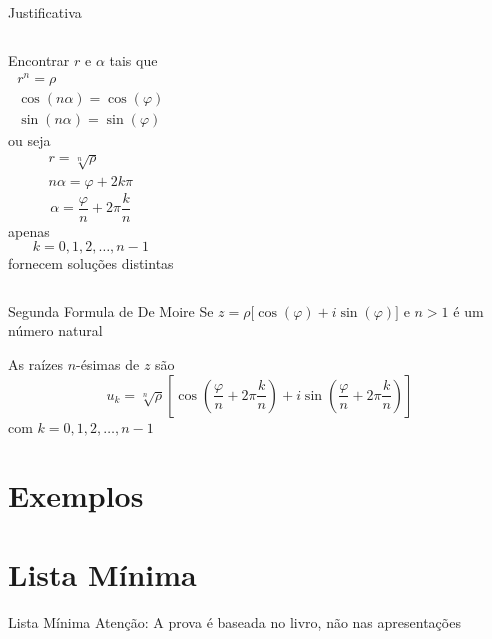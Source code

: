 \documentclass[fleqn,utf8,aspectratio=169,12pt,ignorenonframetext]{beamer}
\begin{document}
\begin{proofframe}{Justificativa}
\begin{columns}
  Encontrar $r$ e $\alpha$
  \pause
   tais que
  \begin{gather*}
    r^n = \rho \\
    \cos(n\alpha) = \cos(\varphi) \\
    \sin(n\alpha) = \sin(\varphi)
  \end{gather*}
  \pause
  ou seja
  \begin{gather*}
    r = \sqrt[n]{\rho} \\
    n\alpha = \varphi + 2k\pi
  \end{gather*}
  \pause
  \[
    \alpha = \frac{\varphi}{n} + 2\pi\frac{k}{n}
  \]
  \pause
  apenas
  \[
    k = 0, 1, 2, \dots, n-1
  \]
  fornecem soluções distintas
\end{columns}
\end{proofframe}

\begin{frame}{Segunda Formula de De Moire}
  Se
  \(
    z = \rho \big[\cos(\varphi) + i\sin(\varphi)\big]
  \)
  e $n>1$ é um número natural

  \vspace{\baselineskip}
  As raízes $n$-ésimas de $z$ são
  \[
    u_k = \sqrt[n]{\rho}
    \left[
         \cos\left(\frac{\varphi}{n}+2\pi\frac{k}{n}\right)
      + i\sin\left(\frac{\varphi}{n}+2\pi\frac{k}{n}\right)
    \right]
  \]
  com \(k=0, 1, 2, \dots, n-1\)
\end{frame}

\section{Exemplos}







\section{Lista Mínima}

\begin{frame}{Lista Mínima}
  Atenção: A prova é baseada no livro, não nas apresentações
\end{frame}

\end{document}
